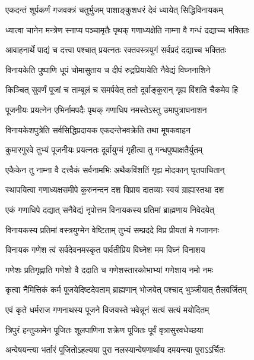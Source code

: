 \begin{center}
\twolineshloka
{एकदन्तं शूर्पकर्णं गजवक्त्रं चतुर्भुजम्}
{पाशाङ्कुशधरं देवं ध्यायेत् सिद्धिविनायकम्}%

\twolineshloka
{ध्यात्वा चानेन मन्त्रेण स्नाप्य पञ्चामृतैः पृथक्}
{गणाध्यक्षेति नाम्ना वै गन्धं दद्याच्च भक्तितः}%

\twolineshloka
{आवाहनार्थे पाद्यं च दत्त्वा पश्चात् प्रयत्नतः}
{रक्तवस्त्रयुगं सर्वप्रदं दद्याच्च भक्तितः}%

\twolineshloka
{विनायकेति पुष्पाणि धूपं चोमासुताय च}
{दीपं रुद्रप्रियायेति नैवेद्यं विघ्ननाशिने}%

\twolineshloka
{किञ्चित् सुवर्णं पूजां च ताम्बूलं च समर्पयेत्}
{ततो दूर्वाङ्कुरान् गृह्य विंशति चैकमेव हि}%

\twolineshloka
{पूजनीयः प्रयत्नेन एभिर्नामपदैः पृथक्}
{गणाधिप नमस्तेऽस्तु उमापुत्राघनाशन}%

\twolineshloka
{विनायकेशपुत्रेति सर्वसिद्धिप्रदायक}
{एकदन्तेभवक्रेति तथा मूषकवाहन}%

\twolineshloka
{कुमारगुरवे तुभ्यं पूजनीयः प्रयत्नतः}
{दूर्वायुग्मं गृहीत्वा तु गन्धपुष्पाक्षतैर्युतम्}%

\twolineshloka
{एकैकेन तु नाम्ना वै दत्त्वैकं सर्वनामभिः}
{अथैकविंशतिं गृह्य मोदकान् घृतपाचितान्}%

\twolineshloka
{स्थापयित्वा गणाध्यक्षसमीपे कुरुनन्दन}
{दश विप्राय दातव्याः स्वयं ग्राह्यास्तथा दश}%

\twolineshloka
{एकं गणाधिपे दद्यात् सनैवेद्यं नृपोत्तम}
{विनायकस्य प्रतिमां ब्राह्मणाय निवेदयेत्}%

\twolineshloka
{विनायकस्य प्रतिमां वस्त्रयुग्मेन वेष्टिताम्}
{तुभ्यं सम्प्रददे विप्र प्रीयतां मे गजाननः}%

\twolineshloka
{विनायक गणेश त्वं सर्वदेवनमस्कृत}
{पार्वतीप्रिय विघ्नेश मम विघ्नं विनाशय}%

\twolineshloka
{गणेशः प्रतिगृह्णाति गणेशो वै ददाति च}
{गणेशस्तारकोभाभ्यां गणेशाय नमो नमः}%

\twolineshloka
{कृत्वा नैमित्तिकं कर्म पूजयेदिष्टदेवताम्}
{ब्राह्मणान् भोजयेत् पश्चाद् भुञ्जीयात् तैलवर्जितम्}%

\twolineshloka
{एवं कृते धर्मराज गणनाथस्य पूजने}
{विजयस्ते भवेन्नूनं सत्यं सत्यं मयोदितम्}%

\twolineshloka
{त्रिपुरं हन्तुकामेन पूजितः शूलपाणिना}
{शक्रेण पूजितः पूर्वं वृत्रासुरवधेच्छया}%

\twolineshloka
{अन्वेषयन्त्या भर्तारं पूजितोऽहल्यया पुरा}
{नलस्यान्वेषणार्थाय दमयन्त्या पुराऽऽर्चितः}%


\end{center}
